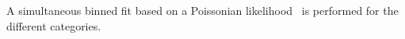 
A simultaneous binned fit based on a Poissonian likelihood~\cite{PoisLR} is performed
for the different categories.
